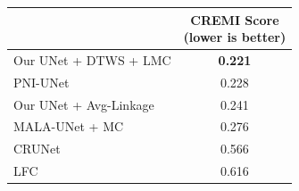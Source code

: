 \begin{figure}[t]
\begin{minipage}[t]{0.48\textwidth}
\begin{tabular}[t]{l|c}
         & \makecell{CREMI Score \\(lower is better)}  \\ \midrule
Our UNet + DTWS + LMC &  \textbf{0.221}\\
PNI-UNet & 0.228 \\
Our UNet + \algname{} Avg-Linkage & 0.241 \\
MALA-UNet + MC \cite{funke2018large} & 0.276 \\
CRUNet \cite{zeng2017deepem3d} & 0.566  \\
LFC \cite{parag2017anisotropic} & 0.616  \\
        \end{tabular}
        \vspace*{1.5em}
    \label{tab:results_cremi_test}
\end{minipage}
\end{figure}
\captionsetup[subfigure]{justification=centering, singlelinecheck=off}
